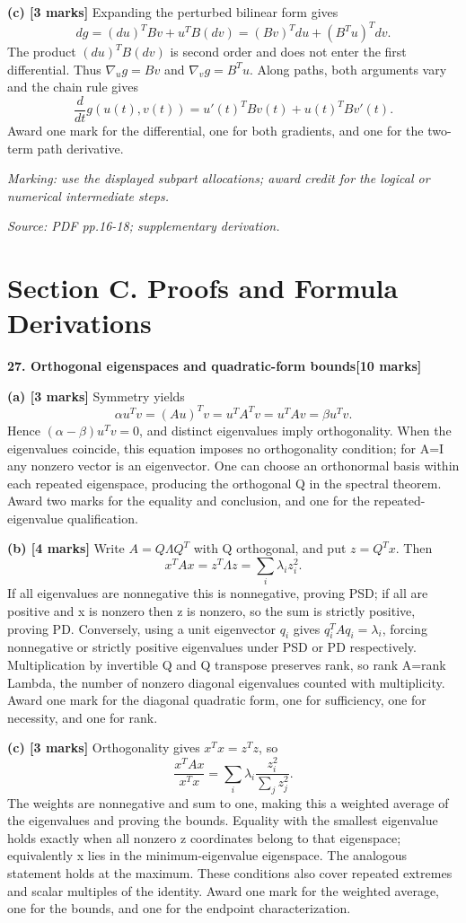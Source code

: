 \documentclass[11pt,a4paper]{article}
\begin{document}
\textbf{(c) [3 marks]} Expanding the perturbed bilinear form gives \[dg=(du)^TBv+u^TB(dv)=(Bv)^Tdu+(B^Tu)^Tdv.\] The product \((du)^TB(dv)\) is second order and does not enter the first differential. Thus \(\nabla_u g=Bv\) and \(\nabla_v g=B^Tu\). Along paths, both arguments vary and the chain rule gives \[\frac{d}{dt}g(u(t),v(t))=u'(t)^TBv(t)+u(t)^TBv'(t).\] Award one mark for the differential, one for both gradients, and one for the two-term path derivative.

\textit{Marking: use the displayed subpart allocations; award credit for the logical or numerical intermediate steps.}\par
{\footnotesize\textit{Source: PDF pp.16-18; supplementary derivation.}}
\newpage\section*{Section C. Proofs and Formula Derivations}
\textbf{27. Orthogonal eigenspaces and quadratic-form bounds}\hfill\textbf{[10 marks]}\par\medskip
\textbf{(a) [3 marks]} Symmetry yields \[\alpha u^Tv=(Au)^Tv=u^TA^Tv=u^TAv=\beta u^Tv.\] Hence \((\alpha-\beta)u^Tv=0\), and distinct eigenvalues imply orthogonality. When the eigenvalues coincide, this equation imposes no orthogonality condition; for A=I any nonzero vector is an eigenvector. One can choose an orthonormal basis within each repeated eigenspace, producing the orthogonal Q in the spectral theorem. Award two marks for the equality and conclusion, and one for the repeated-eigenvalue qualification.

\textbf{(b) [4 marks]} Write \(A=Q\Lambda Q^T\) with Q orthogonal, and put \(z=Q^Tx\). Then \[x^TAx=z^T\Lambda z=\sum_i\lambda_i z_i^2.\] If all eigenvalues are nonnegative this is nonnegative, proving PSD; if all are positive and x is nonzero then z is nonzero, so the sum is strictly positive, proving PD. Conversely, using a unit eigenvector \(q_i\) gives \(q_i^TAq_i=\lambda_i\), forcing nonnegative or strictly positive eigenvalues under PSD or PD respectively. Multiplication by invertible Q and Q transpose preserves rank, so rank A=rank Lambda, the number of nonzero diagonal eigenvalues counted with multiplicity. Award one mark for the diagonal quadratic form, one for sufficiency, one for necessity, and one for rank.

\textbf{(c) [3 marks]} Orthogonality gives \(x^Tx=z^Tz\), so \[\frac{x^TAx}{x^Tx}=\sum_i\lambda_i\frac{z_i^2}{\sum_j z_j^2}.\] The weights are nonnegative and sum to one, making this a weighted average of the eigenvalues and proving the bounds. Equality with the smallest eigenvalue holds exactly when all nonzero z coordinates belong to that eigenspace; equivalently x lies in the minimum-eigenvalue eigenspace. The analogous statement holds at the maximum. These conditions also cover repeated extremes and scalar multiples of the identity. Award one mark for the weighted average, one for the bounds, and one for the endpoint characterization.
\end{document}
